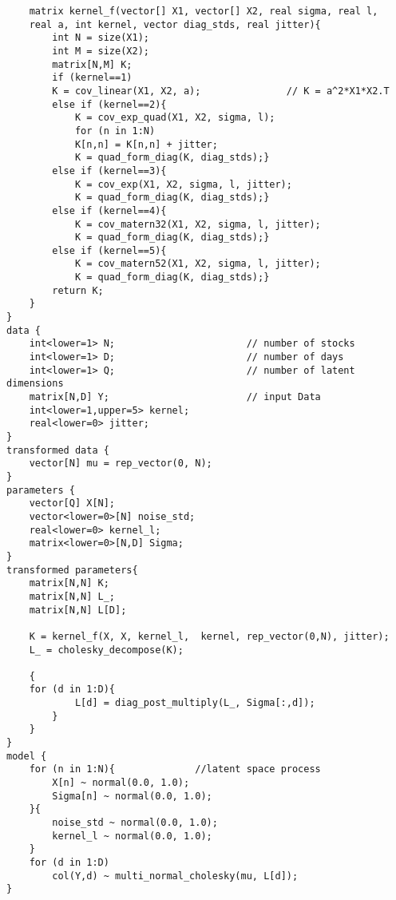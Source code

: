 \begin{lstlisting}
	matrix kernel_f(vector[] X1, vector[] X2, real sigma, real l, 
	real a, int kernel, vector diag_stds, real jitter){
		int N = size(X1);
		int M = size(X2);
		matrix[N,M] K;
		if (kernel==1)
		K = cov_linear(X1, X2, a);               // K = a^2*X1*X2.T
		else if (kernel==2){
			K = cov_exp_quad(X1, X2, sigma, l);
			for (n in 1:N)
			K[n,n] = K[n,n] + jitter;
			K = quad_form_diag(K, diag_stds);}
		else if (kernel==3){
			K = cov_exp(X1, X2, sigma, l, jitter);
			K = quad_form_diag(K, diag_stds);}
		else if (kernel==4){
			K = cov_matern32(X1, X2, sigma, l, jitter);
			K = quad_form_diag(K, diag_stds);}
		else if (kernel==5){
			K = cov_matern52(X1, X2, sigma, l, jitter);
			K = quad_form_diag(K, diag_stds);}
		return K;
	}
}
data {
	int<lower=1> N;                       // number of stocks
	int<lower=1> D;                       // number of days
	int<lower=1> Q;                       // number of latent dimensions
	matrix[N,D] Y;                        // input Data
	int<lower=1,upper=5> kernel;
	real<lower=0> jitter;
}
transformed data {
	vector[N] mu = rep_vector(0, N);
}
parameters {
	vector[Q] X[N];
	vector<lower=0>[N] noise_std;
	real<lower=0> kernel_l;
	matrix<lower=0>[N,D] Sigma;
}
transformed parameters{
	matrix[N,N] K;
	matrix[N,N] L_;
	matrix[N,N] L[D];
	
	K = kernel_f(X, X, kernel_l,  kernel, rep_vector(0,N), jitter);
	L_ = cholesky_decompose(K);
	
	{
	for (d in 1:D){
			L[d] = diag_post_multiply(L_, Sigma[:,d]);
		}
	}
}
model {
	for (n in 1:N){              //latent space process
		X[n] ~ normal(0.0, 1.0);
		Sigma[n] ~ normal(0.0, 1.0);
	}{
		noise_std ~ normal(0.0, 1.0);
		kernel_l ~ normal(0.0, 1.0);
	} 
	for (d in 1:D)
		col(Y,d) ~ multi_normal_cholesky(mu, L[d]);
}
\end{lstlisting}
\cleardoubleoddpage

